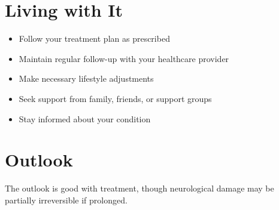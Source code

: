 \section{Living with It}
\begin{itemize}[noitemsep]
  \item Follow your treatment plan as prescribed
  \item Maintain regular follow-up with your healthcare provider
  \item Make necessary lifestyle adjustments
  \item Seek support from family, friends, or support groups
  \item Stay informed about your condition
\end{itemize}
\section{Outlook}
The outlook is good with treatment, though neurological damage may be partially irreversible if prolonged.
